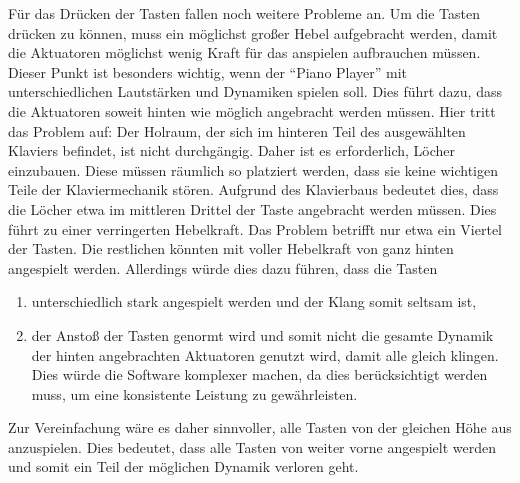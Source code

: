 Für das Drücken der Tasten fallen noch weitere Probleme an. Um die Tasten drücken zu können, muss ein möglichst großer
Hebel aufgebracht werden, damit die Aktuatoren möglichst wenig Kraft für das anspielen aufbrauchen müssen.
Dieser Punkt ist besonders wichtig, wenn der \enquote{Piano Player} mit unterschiedlichen Lautstärken und Dynamiken spielen soll.
Dies führt dazu, dass die Aktuatoren soweit hinten wie möglich angebracht werden müssen. %
\newline
Hier tritt das Problem auf:
Der Holraum, der sich im hinteren Teil des ausgewählten Klaviers befindet, ist nicht durchgängig. Daher ist es
erforderlich, Löcher einzubauen. Diese müssen räumlich so platziert werden, dass sie keine wichtigen Teile der Klaviermechanik
stören. Aufgrund des Klavierbaus bedeutet dies, dass die Löcher etwa im mittleren Drittel der Taste angebracht werden müssen.
Dies führt zu einer verringerten Hebelkraft. Das Problem betrifft nur etwa ein Viertel der Tasten. Die restlichen könnten mit
voller Hebelkraft von ganz hinten angespielt werden. Allerdings würde dies dazu führen, dass die Tasten
\begin{enumerate}
	\item unterschiedlich stark angespielt werden und der Klang somit seltsam ist,
	\item der Anstoß der Tasten genormt wird und somit nicht die gesamte Dynamik der hinten angebrachten Aktuatoren genutzt
	wird, damit alle gleich klingen. Dies würde die Software komplexer machen, da dies berücksichtigt werden muss, um eine
	konsistente Leistung zu gewährleisten.
\end{enumerate}
Zur Vereinfachung wäre es daher sinnvoller, alle Tasten von der gleichen Höhe aus anzuspielen. Dies bedeutet, dass alle
Tasten von weiter vorne angespielt werden und somit ein Teil der möglichen Dynamik verloren geht. \newline

